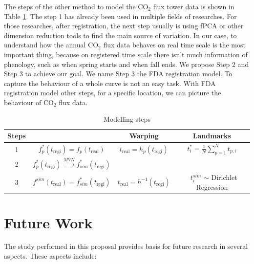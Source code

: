 \documentclass{article}
\begin{document}
The steps of the other method to model the CO$_2$ flux tower data is shown in Table \ref{Tab:ModelStep}. The step 1 has already been used in multiple fields of researches.  For those researches, after registration,  the next step usually is using fPCA or other dimension reduction tools to find the main source of variation. In our case,  to understand how the annual CO$_2$ flux data behaves on real time scale is the most important thing, because on registered time scale there isn't much information of phenology, such as when spring starts and when fall ends.
We propose Step 2 and Step 3 to achieve our goal. We name Step 3 the FDA registration model. To capture the behaviour of a whole curve is not an easy task. With FDA registration model other steps, for a specific location, we can picture the behaviour of CO$_2$ flux data. 

\begin{table}[!h]
\caption{Modelling steps}\label{Tab:ModelStep}
\centering
\def\arraystretch{1.5}
\begin{tabular}{cccc}
\hline
\textbf{Steps} & & \textbf{Warping} & \textbf{Landmarks}\\
\hline 
 1 & $f^{*}_p(t_{\textrm{regi}}) = f_p(t_{\textrm{real}})$ & $t_{\textrm{real}}=h_p(t_{\textrm{regi}})$ &  $t_i^{*}=\frac{1}{N}\sum_{p=1}^Nt_{p,i}$ \\
 2 & $f^{*}_p(t_{\textrm{regi}}) \xrightarrow{MVN} f^{*}_{sim}(t_{\textrm{regi}}) $ &  & \\
 3 & $f^{sim}(t_{\textrm{real}}) = f^{*}_{sim}(t_{\textrm{regi}})$ & $t_\textrm{real}=h^{-1}(t_{\textrm{regi}})$ & $\;\;t_i^{sim}$ $\sim$ Dirichlet Regression \\
\hline
\end{tabular}
\end{table}

\section{Future Work}\label{Sec:FutureWork}


The study performed in this proposal provides basis for future research in several aspects. These aspects include:
\end{document}
